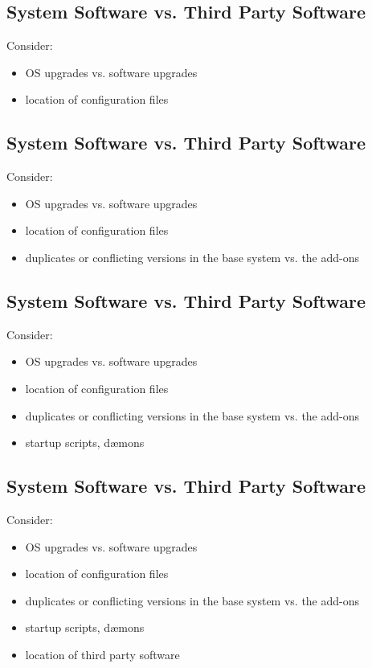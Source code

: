 \documentclass[xga]{xdvislides}
\begin{document}
\subsection{System Software vs. Third Party Software}
Consider:
\begin{itemize}
	\item OS upgrades vs. software upgrades
	\item location of configuration files
\end{itemize}

\subsection{System Software vs. Third Party Software}
Consider:
\begin{itemize}
	\item OS upgrades vs. software upgrades
	\item location of configuration files
	\item duplicates or conflicting versions in the base system vs. the
		add-ons
\end{itemize}

\subsection{System Software vs. Third Party Software}
Consider:
\begin{itemize}
	\item OS upgrades vs. software upgrades
	\item location of configuration files
	\item duplicates or conflicting versions in the base system vs. the
		add-ons
	\item startup scripts, d{\ae}mons
\end{itemize}

\subsection{System Software vs. Third Party Software}
Consider:
\begin{itemize}
	\item OS upgrades vs. software upgrades
	\item location of configuration files
	\item duplicates or conflicting versions in the base system vs. the
		add-ons
	\item startup scripts, d{\ae}mons
	\item location of third party software
\end{itemize}
\end{document}
